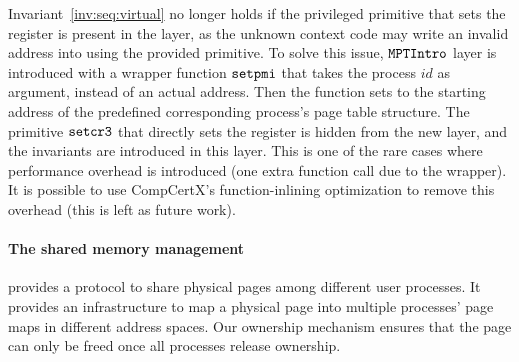 Invariant~\ref{inv:seq:virtual} no longer holds 
if the privileged primitive that sets the 
register is present in the layer, as the unknown context code may write
an invalid address into  using the provided primitive. To solve this issue, 
${\texttt{MPTIntro}}$
layer is introduced with a wrapper function 
${\texttt{setpmi}}$
that takes the process $id$ as argument,
instead of an actual address. Then the function sets  to the
starting address of the predefined corresponding process's page table structure.
The primitive ${\texttt{setcr3}}$ that directly sets the  register is hidden from the
new layer, and the invariants are introduced in this layer.
This is one of the rare cases where performance overhead is introduced
(one extra function call due to the wrapper).
It is possible to use CompCertX's function-inlining optimization
to remove this overhead (this is left as future work).

\paragraph{The shared memory management} provides a protocol to share physical
pages among different user processes. 
It provides an infrastructure to map a physical page into multiple
processes' page maps in different address spaces.
Our ownership mechanism ensures that the page can only be freed once 
all processes release ownership.

